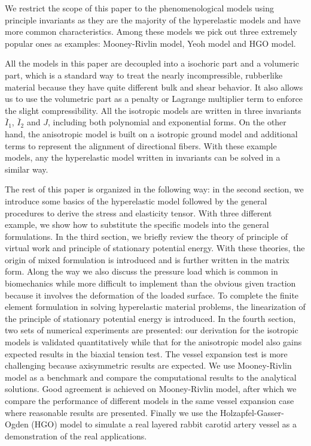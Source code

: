 We restrict the scope of this paper to the phenomenological models using principle invariants as they are the majority of the hyperelastic models and have more common characteristics. Among these models we pick out three extremely popular ones as examples: Mooney-Rivlin model, Yeoh model and HGO model.

All the models in this paper are decoupled into a isochoric part and a volumeric part, which is a standard way to treat the nearly incompressible, rubberlike material because they have quite different bulk and shear behavior. It also allows us to use the volumetric part as a penalty or Lagrange multiplier term to enforce the slight compressibility. All the isotropic models are written in three invariants $\bar{I}_1$, $\bar{I}_2$ and $J$, including both polynomial and exponential forms. On the other hand, the anisotropic model is built on a isotropic ground model and additional terms to represent the alignment of directional fibers. With these example models, any the hyperelastic model written in invariants can be solved in a similar way.

The rest of this paper is organized in the following way: in the second section, we introduce some basics of the hyperelastic model followed by the general procedures to derive the stress and elasticity tensor. With three different example, we show how to substitute the specific models into the general formulations. In the third section, we briefly review the theory of principle of virtual work and principle of stationary potential energy. With these theories, the origin of mixed formulation is introduced and is further written in the matrix form. Along the way we also discuss the pressure load which is common in biomechanics while more difficult to implement than the obvious given traction because it involves the deformation of the loaded surface. To complete the finite element formulation in solving hyperelastic material problems, the linearization of the principle of stationary potential energy is introduced. In the fourth section, two sets of numerical experiments are presented: our derivation for the isotropic models is validated quantitatively while that for the anisotropic model also gains expected results in the biaxial tension test. The vessel expansion test is more challenging because axisymmetric results are expected. We use Mooney-Rivlin model as a benchmark and compare the computational results to the analytical solutions. Good agreement is achieved on Mooney-Rivlin model, after which we compare the performance of different models in the same vessel expansion case where reasonable results are presented. Finally we use the Holzapfel-Gasser-Ogden (HGO) model to simulate a real layered rabbit carotid artery vessel as a demonstration of the real applications.


 



